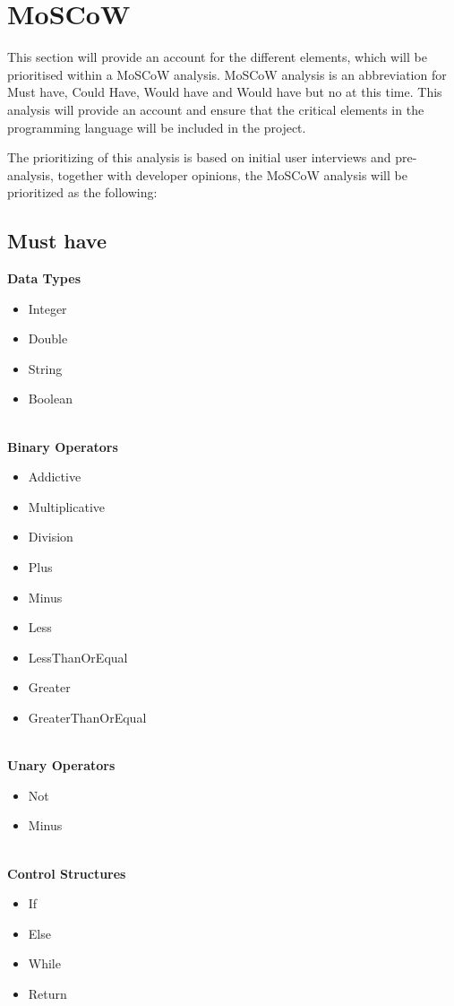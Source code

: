 \section{MoSCoW}


This section will provide an account for the different elements, which will be prioritised within a MoSCoW analysis. MoSCoW analysis is an abbreviation for Must have, Could Have, Would have and Would have but no at this time. This analysis will provide an account and ensure that the critical elements in the programming language will be included in the project. 

The prioritizing of this analysis is based on initial user interviews and pre-analysis, together with developer opinions, the MoSCoW analysis will be prioritized as the following:\\  

\subsection{Must have}
\textbf{Data Types} 

\begin{itemize} 
    \item Integer
    \item Double
    \item String
    \item Boolean
\end{itemize} 
\\
\textbf{Binary Operators} \\
\begin{itemize} 
    \item Addictive
    \item Multiplicative
    \item Division
    \item Plus
    \item Minus
    \item Less
    \item LessThanOrEqual
    \item Greater
    \item GreaterThanOrEqual
\end{itemize} 
\\
\textbf{Unary Operators} \\
\begin{itemize} 
    \item Not
    \item Minus
\end{itemize}
\\
\textbf{Control Structures} \\
\begin{itemize} 
    \item If
    \item Else
    \item While
    \item Return
\end{itemize} 
\\
